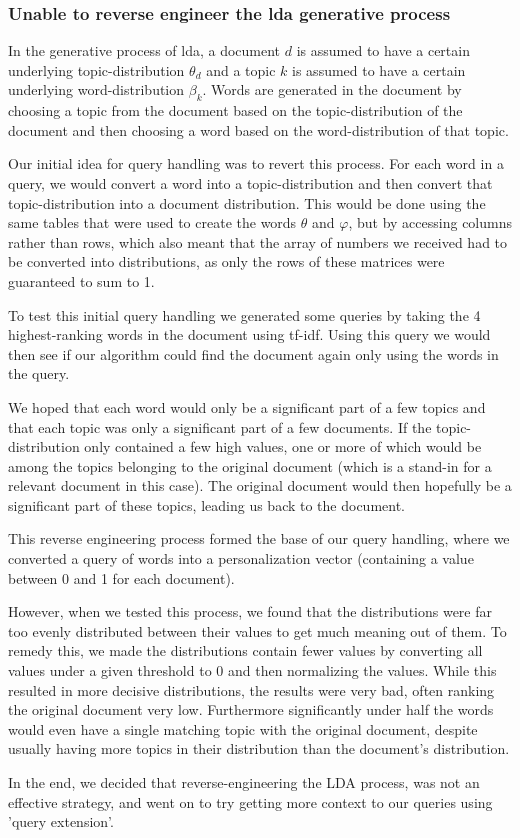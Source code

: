 \subsubsection{Unable to reverse engineer the \gls{lda} generative process}
In the generative process of \gls{lda}, a document $d$ is assumed to have a certain underlying topic-distribution $\theta_d$ and a topic $k$ is assumed to have a certain underlying word-distribution $\beta_k$.
Words are generated in the document by choosing a topic from the document based on the topic-distribution of the document and then choosing a word based on the word-distribution of that topic.

Our initial idea for query handling was to revert this process.
For each word in a query, we would convert a word into a topic-distribution and then convert that topic-distribution into a document distribution.
This would be done using the same tables that were used to create the words $\theta$ and $\varphi$, but by accessing columns rather than rows, which also meant that the array of numbers we received had to be converted into distributions, as only the rows of these matrices were guaranteed to sum to 1.

To test this initial query handling we generated some queries by taking the 4 highest-ranking words in the document using tf-idf. Using this query we would then see if our algorithm could find the document again only using the words in the query.

We hoped that each word would only be a significant part of a few topics and that each topic was only a significant part of a few documents.
If the topic-distribution only contained a few high values, one or more of which would be among the topics belonging to the original document (which is a stand-in for a relevant document in this case).
The original document would then hopefully be a significant part of these topics, leading us back to the document.

This reverse engineering process formed the base of our query handling, where we converted a query of words into a personalization vector (containing a value between 0 and 1 for each document).

However, when we tested this process, we found that the distributions were far too evenly distributed between their values to get much meaning out of them.
To remedy this, we made the distributions contain fewer values by converting all values under a given threshold to 0 and then normalizing the values.
While this resulted in more decisive distributions, the results were very bad, often ranking the original document very low.
Furthermore significantly under half the words would even have a single matching topic with the original document, despite usually having more topics in their distribution than the document's distribution.
 
In the end, we decided that reverse-engineering the LDA process, was not an effective strategy, and went on to try getting more context to our queries using 'query extension'.
